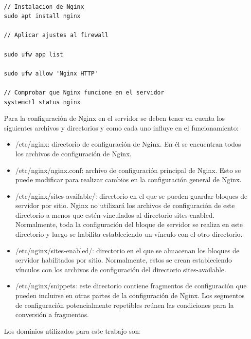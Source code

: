 \begin{lstlisting}[label=cod:nginx-install,caption=Instalación de Nginx en servidor con sistema operativo Linux.] 

// Instalacion de Nginx
sudo apt install nginx

// Aplicar ajustes al firewall

sudo ufw app list

sudo ufw allow 'Nginx HTTP'

// Comprobar que Nginx funcione en el servidor
systemctl status nginx

\end{lstlisting} 

Para la configuración de Nginx en el servidor se deben tener en cuenta los siguientes archivos y directorios y como cada uno influye en el funcionamiento:

\begin{itemize}
	\item /etc/nginx: directorio de configuración de Nginx. En él se encuentran todos los archivos de configuración de Nginx.
	
	\item /etc/nginx/nginx.conf: archivo de configuración principal de Nginx. Esto se puede modificar para realizar cambios en la configuración general de Nginx.
	
	\item /etc/nginx/sites-available/: directorio en el que se pueden guardar bloques de servidor por sitio. Nginx no utilizará los archivos de configuración de este directorio a menos que estén vinculados al directorio sites-enabled. Normalmente, toda la configuración del bloque de servidor se realiza en este directorio y luego se habilita estableciendo un vínculo con el otro directorio.
	
	\item /etc/nginx/sites-enabled/: directorio en el que se almacenan los bloques de servidor habilitados por sitio. Normalmente, estos se crean estableciendo vínculos con los archivos de configuración del directorio sites-available.

	\item /etc/nginx/snippets: este directorio contiene fragmentos de configuración que pueden incluirse en otras partes de la configuración de Nginx. Los segmentos de configuración potencialmente repetibles reúnen las condiciones para la conversión a fragmentos.
\end{itemize}

Los dominios utilizados para este trabajo son:

